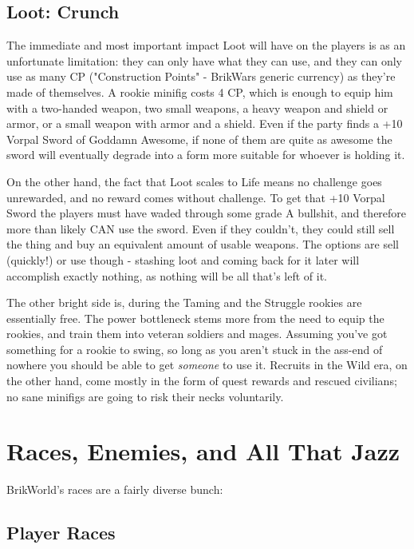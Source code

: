 \documentclass[12pt,a4paper,twocolumn]{article}
\begin{document}
\subsection{Loot: Crunch}

The immediate and most important impact Loot will have on the players is as an unfortunate limitation: they can only have what they can use, and they can only use as many CP ("Construction Points" - BrikWars generic currency) as they're made of themselves.  A rookie minifig costs 4 CP, which is enough to equip him with a two-handed weapon, two small weapons, a heavy weapon and shield or armor, or a small weapon with armor and a shield.  Even if the party finds a +10 Vorpal Sword of Goddamn Awesome, if none of them are quite as awesome the sword will eventually degrade into a form more suitable for whoever is holding it.

On the other hand, the fact that Loot scales to Life means no challenge goes unrewarded, and no reward comes without challenge.  To get that +10 Vorpal Sword the players must have waded through some grade A bullshit, and therefore more than likely CAN use the sword.  Even if they couldn't, they could still sell the thing and buy an equivalent amount of usable weapons.  The options are sell (quickly!) or use though - stashing loot and coming back for it later will accomplish exactly nothing, as nothing will be all that's left of it.

The other bright side is, during the Taming and the Struggle rookies are essentially free.  The power bottleneck stems more from the need to equip the rookies, and train them into veteran soldiers and mages.  Assuming you've got something for a rookie to swing, so long as you aren't stuck in the ass-end of nowhere you should be able to get {\em someone} to use it.  Recruits in the Wild era, on the other hand, come mostly in the form of quest rewards and rescued civilians; no sane minifigs are going to risk their necks voluntarily.

\section{Races, Enemies, and All That Jazz}

BrikWorld's races are a fairly diverse bunch:

\subsection{Player Races}
\end{document}
